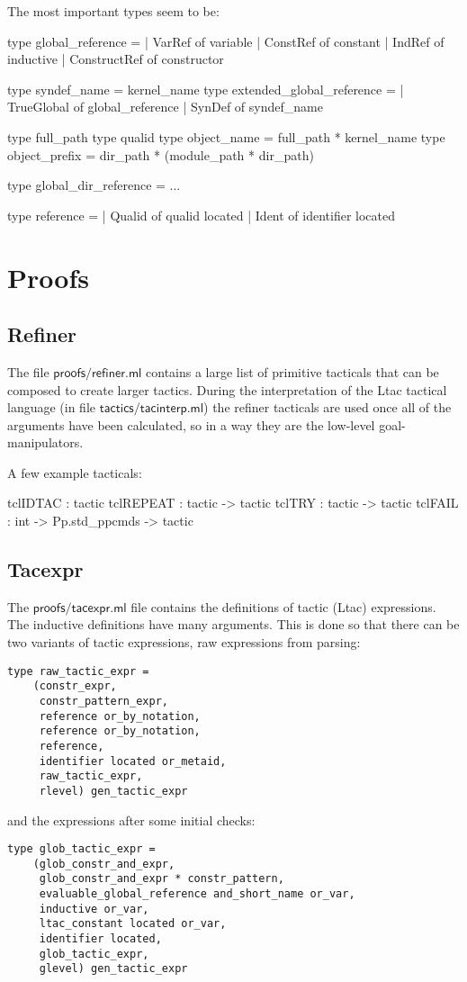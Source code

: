 \documentclass[a4paper,oneside]{book}
\newcommand{\m}[1]{\ensuremath{\mathsf{#1}}}
\begin{document}
The most important types seem to be:

\begin{code}
type global_reference =
  | VarRef of variable
  | ConstRef of constant
  | IndRef of inductive
  | ConstructRef of constructor

type syndef_name = kernel_name
type extended_global_reference =
  | TrueGlobal of global_reference
  | SynDef of syndef_name

type full_path
type qualid
type object_name = full_path * kernel_name
type object_prefix = dir_path * (module_path * dir_path)

type global_dir_reference = ...

type reference =
  | Qualid of qualid located
  | Ident of identifier located
\end{code}

\newpage

\section{Proofs}

\subsection{Refiner}

The file \m{proofs/refiner.ml} contains a large list of primitive
tacticals that can be composed to create larger tactics. During the
interpretation of the Ltac tactical language (in file
\m{tactics/tacinterp.ml}) the refiner tacticals are used once all of
the arguments have been calculated, so in a way they are the low-level
goal-manipulators.

A few example tacticals:

\begin{code}
tclIDTAC  : tactic
tclREPEAT : tactic -> tactic
tclTRY    : tactic -> tactic
tclFAIL   : int -> Pp.std_ppcmds -> tactic
\end{code}

\subsection{Tacexpr}

The \m{proofs/tacexpr.ml} file contains the definitions of tactic
(Ltac) expressions. The inductive definitions have many
arguments. This is done so that there can be two variants of tactic
expressions, raw expressions from parsing:
\begin{lstlisting}
type raw_tactic_expr =
    (constr_expr,
     constr_pattern_expr,
     reference or_by_notation,
     reference or_by_notation,
     reference,
     identifier located or_metaid,
     raw_tactic_expr,
     rlevel) gen_tactic_expr
\end{lstlisting}
and the expressions after some initial checks:
\begin{lstlisting}
type glob_tactic_expr =
    (glob_constr_and_expr,
     glob_constr_and_expr * constr_pattern,
     evaluable_global_reference and_short_name or_var,
     inductive or_var,
     ltac_constant located or_var,
     identifier located,
     glob_tactic_expr,
     glevel) gen_tactic_expr
\end{lstlisting}
\end{document}
